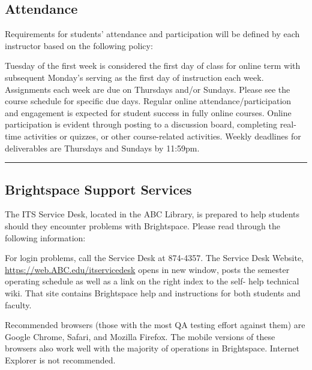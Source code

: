 
\subsection*{Attendance}
 
Requirements for students’ attendance and participation will be defined by each instructor based on the following policy:
\begin{outline}
	\1	Tuesday of the first week is considered the first day of class for online term with subsequent Monday’s serving as the first day of instruction each week. Assignments each week are due on Thursdays and/or Sundays. Please see the course schedule for specific due days.
	\1	Regular online attendance/participation and engagement is expected for student success in fully online courses. Online participation is evident through posting to a discussion board, completing real-time activities or quizzes, or other course-related activities.
	\1	Weekly deadlines for deliverables are Thursdays and Sundays by 11:59pm.
\end{outline}
\vspace{2ex}\hrule\vspace{2ex}




\subsection*{Brightspace Support Services}
The ITS Service Desk, located in the ABC Library, is prepared to help students should they encounter problems with Brightspace. Please read through the following information:
\begin{outline}
	\1	For login problems, call the Service Desk at 874-4357.
	\1	The Service Desk Website, \url{https://web.ABC.edu/itservicedesk} opens in new window, posts the semester operating schedule as well as a link on the right index to the self- help technical wiki. That site contains Brightspace help and instructions for both students and faculty.
\end{outline}


Recommended browsers (those with the most QA testing effort against them) are Google Chrome, Safari, and Mozilla Firefox. The mobile versions of these browsers also work well with the majority of operations in Brightspace. Internet Explorer is not recommended.

